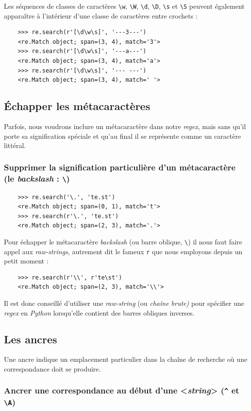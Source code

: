 \documentclass[a4paper,12pt]{book}
\begin{document}
Les séquences de classes de caractères \texttt{\textbackslash{}w}, \texttt{\textbackslash{}W}, \texttt{\textbackslash{}d}, \texttt{\textbackslash{}D}, \texttt{\textbackslash{}s} et \texttt{\textbackslash{}S} peuvent également apparaître à l'intérieur d'une classe de caractères entre crochets :
\begin{verbatim}
    >>> re.search(r'[\d\w\s]', '---3---')
    <re.Match object; span=(3, 4), match='3'>
    >>> re.search(r'[\d\w\s]', '---a---')
    <re.Match object; span=(3, 4), match='a'>
    >>> re.search(r'[\d\w\s]', '--- ---')
    <re.Match object; span=(3, 4), match=' '>
\end{verbatim}
\medskip

\subsection*{Échapper les métacaractères}
Parfois, nous voudrons inclure un métacaractère dans notre \textit{regex}, mais sans qu'il porte sa signification spéciale et qu'au final il se représente comme un caractère littéral.
\medskip

\subsubsection*{Supprimer la signification particulière d'un métacaractère (le \textit{backslash} : \texttt{\textbackslash})}
\begin{verbatim}
    >>> re.search('\.', 'te.st')
    <re.Match object; span=(0, 1), match='t'>
    >>> re.search(r'\.', 'te.st')
    <re.Match object; span=(2, 3), match='.'>
\end{verbatim}
\medskip

Pour échapper le métacaractère \textit{backslash} (ou barre oblique, \texttt{\textbackslash}) il nous faut faire appel aux \textit{raw-strings}, autrement dit le fameux \texttt{r} que nous employons depuis un petit moment :
\begin{verbatim}
    >>> re.search(r'\\', r'te\st')
    <re.Match object; span=(2, 3), match='\\'>
\end{verbatim}
\medskip

Il est donc conseillé d'utiliser une \textit{raw-string} (ou \textit{chaîne brute)} pour spécifier une \textit{regex} en \textit{Python} lorsqu'elle contient des barres obliques inverses.
\medskip

\subsection*{Les ancres}
Une ancre indique un emplacement particulier dans la chaîne de recherche où une correspondance doit se produire.
\medskip

\subsubsection*{Ancrer une correspondance au début d'une <\textit{string}> (\texttt{\^} et \texttt{\textbackslash{}A})}
\end{document}
